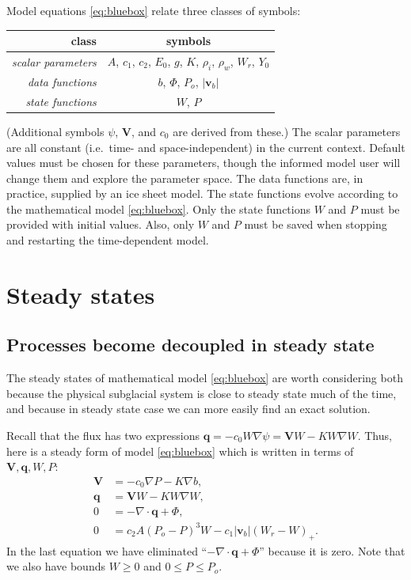 \documentclass[11pt,final]{amsart}%
\newcommand\bv{\mathbf{v}}
\newcommand\bV{\mathbf{V}}
\newcommand\bq{\mathbf{q}}
\newcommand{\Div}{\nabla\cdot}
\newcommand{\grad}{\nabla}
\begin{document}
Model equations \eqref{eq:bluebox} relate three classes of symbols:

\begin{table}[h]
\begin{tabular}{r|c}
class & symbols \\ \hline
\emph{scalar parameters} & $A$, $c_1$, $c_2$, $E_0$, $g$, $K$, $\rho_i$, $\rho_w$, $W_r$, $Y_0$ \\
\emph{data functions} & $b$, $\Phi$, $P_o$, $|\bv_b|$ \\
\emph{state functions} & $W$, $P$
\end{tabular}
\end{table}

\noindent (Additional symbols $\psi$, $\bV$, and $c_0$ are derived from these.)  The scalar parameters are all constant (i.e.~time- and space-independent) in the current context.  %
Default values must be chosen for these parameters, though the informed model user will change them and explore the parameter space.  The data functions are, in practice, supplied by an ice sheet model.  The state functions evolve according to the mathematical model \eqref{eq:bluebox}.  Only the state functions $W$ and $P$ must be provided with initial values.  Also, only $W$ and $P$ must be saved when stopping and restarting the time-dependent model.


\section{Steady states}  \label{sec:steadyverif}

\subsection*{Processes become decoupled in steady state}  The steady states of mathematical model \eqref{eq:bluebox} are worth considering both because the physical subglacial system is close to steady state much of the time, and because in steady state case we can more easily find an exact solution.

Recall that the flux has two expressions $\bq = - c_0 W \grad \psi = \bV W - K W \grad W$.    Thus, here is a steady form of model \eqref{eq:bluebox} which is written in terms of $\bV,\bq,W,P$:
\begin{align}
\bV &= - c_0 \grad P - K \grad b, \label{eq:Vsteady} \\
\bq &= \bV W - K W \grad W, \label{eq:qsteady} \\
0 &= - \Div \bq + \Phi, \label{eq:masscontsteady} \\
0 &= c_2 A (P_o - P)^3 W - c_1 |\bv_b| (W_r - W)_+. \label{eq:openclosesteady}
\end{align}
In the last equation we have eliminated ``$- \Div \bq + \Phi$'' because it is zero.  Note that we also have bounds $W\ge 0$ and $0 \le P \le P_o$.
\end{document}
